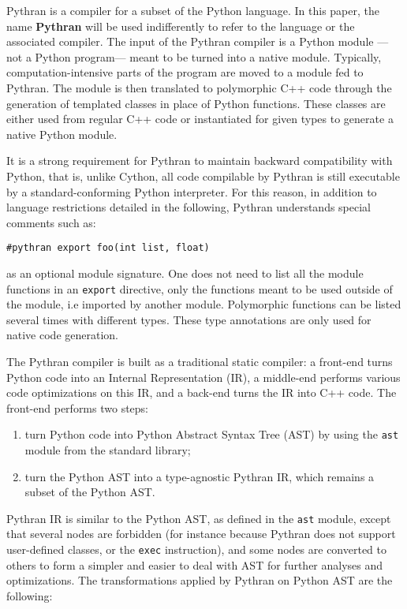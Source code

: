 \documentclass[10pt, onecolumn, preprint]{sigplanconf}
\begin{document}
Pythran is a compiler for a subset of the Python language. In this paper, the
name \textbf{Pythran} will be used indifferently to refer to the language or
the associated compiler. The input of the Pythran compiler is a Python module
---not a Python program--- meant to be turned into a native module. Typically,
computation-intensive parts of the program are moved to a module fed to
Pythran. The module is then translated to polymorphic C++ code through the
generation of templated classes in place of Python functions. These
classes are either used from regular C++ %
code or instantiated for given types to generate a native Python module.

It is a strong requirement for Pythran to maintain backward compatibility with
Python, that is, unlike Cython, all code compilable by Pythran is still
executable by a standard-conforming Python interpreter. For this reason, in
addition to language restrictions detailed in the following, Pythran
understands special comments such as:

\begin{lstlisting}
#pythran export foo(int list, float)
\end{lstlisting}

as an optional module signature. One does not need to list all the module
functions in an \texttt{export} directive, only the functions meant to be used
outside of the module, i.e imported by another module.
Polymorphic functions can be listed several times with
different types. These type annotations are only used for native code generation.

The Pythran compiler is built as a traditional static compiler: a front-end
turns Python code into an Internal Representation (IR), a middle-end performs
various code optimizations on this IR, and a back-end turns the IR into C++
code. The front-end performs two steps:

\begin{enumerate}

    \item turn Python code into Python Abstract Syntax Tree (AST) by using the \texttt{ast}
   module from the standard library;

    \item turn the Python AST into a type-agnostic Pythran IR, which remains a subset
   of the Python AST.

\end{enumerate}

Pythran IR is similar to the Python AST, as defined in the \texttt{ast} module, except
that several nodes are forbidden (for instance because Pythran does not support
user-defined classes, or the \texttt{exec} instruction), and some nodes are converted
to others to form a simpler and easier to deal with AST for further analyses and
optimizations. The transformations applied by Pythran on Python AST are the
following:
\end{document}
